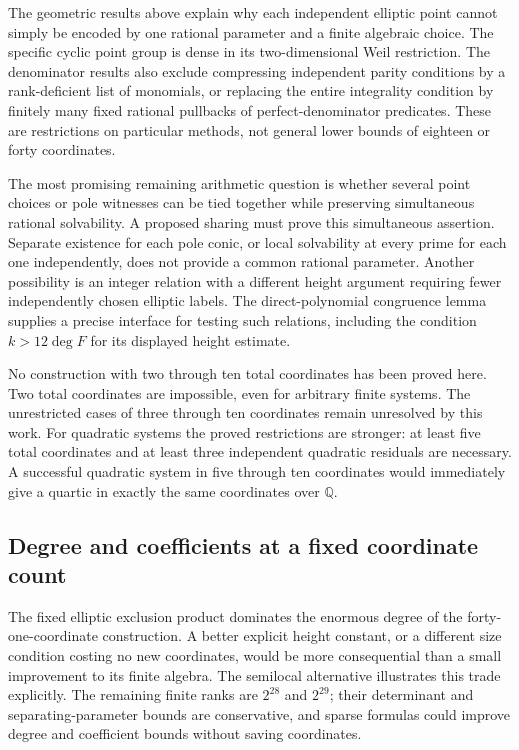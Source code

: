 \documentclass[11pt]{article}
\theoremstyle{definition}
\begin{document}
The geometric results above explain why each independent elliptic
point cannot simply be encoded by one rational parameter and a finite
algebraic choice. The specific cyclic point group is dense in its
two-dimensional Weil restriction. The denominator results also exclude
compressing independent parity conditions by a rank-deficient list of
monomials, or replacing the entire integrality condition by finitely
many fixed rational pullbacks of perfect-denominator predicates.
These are restrictions on particular methods, not general lower bounds
of eighteen or forty coordinates.

The most promising remaining arithmetic question is whether several
point choices or pole witnesses can be tied together while preserving
simultaneous rational solvability. A proposed sharing must prove this
simultaneous assertion. Separate existence for each pole conic, or
local solvability at every prime for each one independently, does not
provide a common rational parameter. Another possibility is an integer
relation with a different height argument requiring fewer independently
chosen elliptic labels. The direct-polynomial congruence lemma supplies
a precise interface for testing such relations, including the condition
$k>12\deg F$ for its displayed height estimate.

No construction with two through ten total coordinates has been proved
here. Two total coordinates are impossible, even for arbitrary finite
systems. The unrestricted cases of three through ten coordinates remain
unresolved by this work. For quadratic systems the proved restrictions
are stronger: at least five total coordinates and at least three
independent quadratic residuals are necessary. A successful quadratic
system in five through ten coordinates would immediately give a
quartic in exactly the same coordinates over $\mathbb Q$.

\subsection{Degree and coefficients at a fixed coordinate count}

The fixed elliptic exclusion product dominates the enormous degree of
the forty-one-coordinate construction. A better explicit height
constant, or a different size condition costing no new coordinates,
would be more consequential than a small improvement to its finite
algebra. The semilocal alternative illustrates this trade explicitly.
The remaining finite ranks are $2^{28}$ and $2^{29}$; their determinant
and separating-parameter bounds are conservative, and sparse formulas
could improve degree and coefficient bounds without saving coordinates.
\end{document}

